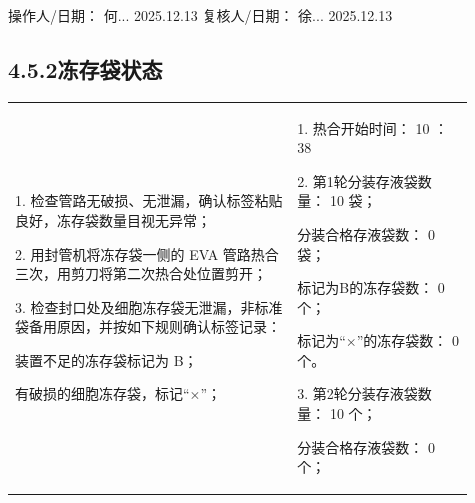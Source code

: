 \documentclass[UTF8,10pt,a4paper,fontset=fandol]{ctexart}
\newcommand{\fieldvalue}[1]{#1}
\newcommand{\handwritten}[1]{#1}
\begin{document}
\noindent
操作人/日期：
\fieldvalue{\handwritten{何...}}
\quad
\fieldvalue{\handwritten{2025.12.13}}
\qquad
复核人/日期：
\fieldvalue{\handwritten{徐...}}
\quad
\fieldvalue{\handwritten{2025.12.13}}

\subsection*{4.5.2\quad 冻存袋状态}

\noindent
\begin{tabular}{|p{0.56\linewidth}|p{0.35\linewidth}|}
\hline
1. 检查管路无破损、无泄漏，确认标签粘贴良好，冻存袋数量目视无异常；

2. 用封管机将冻存袋一侧的 EVA 管路热合三次，用剪刀将第二次热合处位置剪开；

3. 检查封口处及细胞冻存袋无泄漏，非标准袋备用原因，并按如下规则确认标签记录：

\quad 装置不足的冻存袋标记为 B；

\quad 有破损的细胞冻存袋，标记“$\times$”； &
1. 热合开始时间：
\fieldvalue{\handwritten{10}}
：
\fieldvalue{\handwritten{38}}

2. 第1轮分装存液袋数量：
\fieldvalue{\handwritten{10}}
袋；

\quad 分装合格存液袋数：
\fieldvalue{\handwritten{0}}
袋；

\quad 标记为B的冻存袋数：
\fieldvalue{\handwritten{0}}
个；

\quad 标记为“$\times$”的冻存袋数：
\fieldvalue{\handwritten{0}}
个。

3. 第2轮分装存液袋数量：
\fieldvalue{\handwritten{10}}
个；

\quad 分装合格存液袋数：
\fieldvalue{\handwritten{0}}
个；


\end{tabular}
\end{document}
